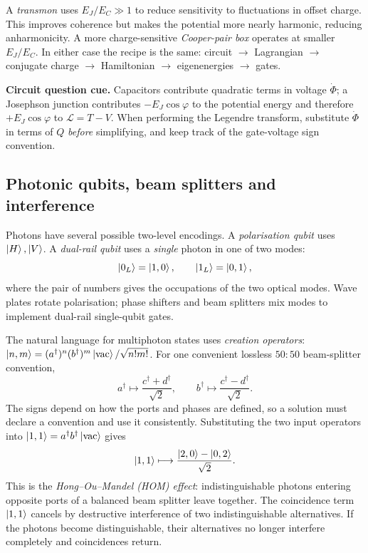 A \emph{transmon} uses $E_J/E_C\gg1$ to reduce sensitivity to fluctuations in offset charge. This improves coherence but makes the potential more nearly harmonic, reducing anharmonicity. A more charge-sensitive \emph{Cooper-pair box} operates at smaller $E_J/E_C$. In either case the recipe is the same: circuit $\to$ Lagrangian $\to$ conjugate charge $\to$ Hamiltonian $\to$ eigenenergies $\to$ gates.

\begin{examtip}
\textbf{Circuit question cue.} Capacitors contribute quadratic terms in voltage $\dot\Phi$; a Josephson junction contributes $-E_J\cos\varphi$ to the potential energy and therefore $+E_J\cos\varphi$ to $\mathcal L=T-V$. When performing the Legendre transform, substitute $\dot\Phi$ in terms of $Q$ \emph{before} simplifying, and keep track of the gate-voltage sign convention.
\end{examtip}

\subsection{Photonic qubits, beam splitters and interference}
Photons have several possible two-level encodings. A \emph{polarisation qubit} uses $\left\lvert H\right\rangle,\left\lvert V\right\rangle$. A \emph{dual-rail qubit} uses a \emph{single} photon in one of two modes:
\begin{equation}\label{eq:dualrail}
\left\lvert 0_L\right\rangle=\left\lvert 1,0\right\rangle,\qquad \left\lvert 1_L\right\rangle=\left\lvert 0,1\right\rangle,
\end{equation}
where the pair of numbers gives the occupations of the two optical modes. Wave plates rotate polarisation; phase shifters and beam splitters mix modes to implement dual-rail single-qubit gates.

The natural language for multiphoton states uses \emph{creation operators}: $\left\lvert n,m\right\rangle=(a^\dagger)^n(b^\dagger)^m\left\lvert \mathrm{vac}\right\rangle/\sqrt{n!m!}$. For one convenient lossless $50{:}50$ beam-splitter convention,
\begin{equation}\label{eq:bs}
a^\dagger\longmapsto\frac{c^\dagger+d^\dagger}{\sqrt2},\qquad
b^\dagger\longmapsto\frac{c^\dagger-d^\dagger}{\sqrt2}.
\end{equation}
The signs depend on how the ports and phases are defined, so a solution must declare a convention and use it consistently. Substituting the two input operators into $\left\lvert 1,1\right\rangle=a^\dagger b^\dagger\left\lvert \mathrm{vac}\right\rangle$ gives
\begin{equation}\label{eq:hom}
\left\lvert 1,1\right\rangle\longmapsto\frac{\left\lvert 2,0\right\rangle-\left\lvert 0,2\right\rangle}{\sqrt2}.
\end{equation}
This is the \emph{Hong--Ou--Mandel (HOM) effect}: indistinguishable photons entering opposite ports of a balanced beam splitter leave together. The coincidence term $\left\lvert 1,1\right\rangle$ cancels by destructive interference of two indistinguishable alternatives. If the photons become distinguishable, their alternatives no longer interfere completely and coincidences return.

